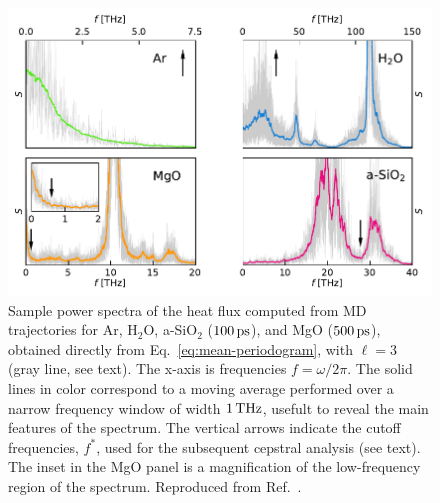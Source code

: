 \begin{figure}[!htb]
    \centering
    \includegraphics[width=\textwidth]{chapters/chapter5/figures/periodograms.pdf}
    \caption{Sample power spectra of the heat flux computed from MD trajectories for Ar, H$_2$O, a-SiO$_2$ ($100\,\mathrm{ps}$), and MgO ($500\,\mathrm{ps}$), obtained directly from Eq.~\eqref{eq:mean-periodogram}, with $\ell=3$ (gray line, see text). The x-axis is frequencies $f=\omega/2\pi$. The solid lines in color correspond to a moving average performed over a narrow frequency window of width $1\,\mathrm{THz}$, usefult to reveal the main features of the spectrum. The vertical arrows indicate the cutoff frequencies, $f^*$, used for the subsequent cepstral analysis (see text). The inset in the MgO panel is a magnification of the low-frequency region of the spectrum. Reproduced from Ref.~\cite{Ercole2017}.
    }
    \label{fig:periodograms}
\end{figure}

